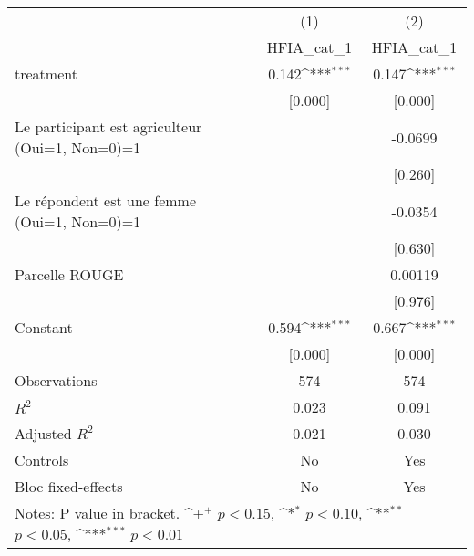 {
\def\sym#1{\ifmmode^{#1}\else\(^{#1}\)\fi}
\begin{tabular*}{1.2\hsize}{@{\hskip\tabcolsep\extracolsep\fill}l*{2}{c}}
\cline{2-3}\cline{2-3}
     &\multicolumn{1}{c}{(1)}&\multicolumn{1}{c}{(2)}\\
     &\multicolumn{1}{c}{HFIA\_cat\_1}&\multicolumn{1}{c}{HFIA\_cat\_1}\\
\cline{2-3}
treatment&0.142\sym{***}&0.147\sym{***}\\
     &[0.000]         &[0.000]         \\
[1em]
Le participant est agriculteur (Oui=1, Non=0)=1&           &-0.0699         \\
     &           &[0.260]         \\
[1em]
Le répondent est une femme (Oui=1, Non=0)=1&           &-0.0354         \\
     &           &[0.630]         \\
[1em]
Parcelle ROUGE&           &0.00119         \\
     &           &[0.976]         \\
[1em]
Constant&0.594\sym{***}&0.667\sym{***}\\
     &[0.000]         &[0.000]         \\
\cline{2-3}
Observations&574         &574         \\
\(R^{2}\)&0.023         &0.091         \\
Adjusted \(R^{2}\)&0.021         &0.030         \\
Controls&No         &Yes         \\
Bloc fixed-effects&No         &Yes         \\
\cline{2-3}\cline{2-3}
\multicolumn{3}{p{1.0\textwidth}}{\footnotesize Notes: P value in bracket. \sym{+} \(p<0.15\), \sym{*} \(p<0.10\), \sym{**} \(p<0.05\), \sym{***} \(p<0.01\)}\\
\end{tabular*}
}
